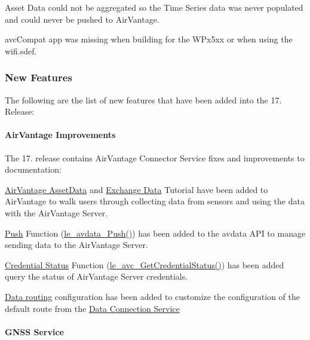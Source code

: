 \begin{DoxyItemize}
\item Asset Data could not be aggregated so the Time Series data was never populated and could never be pushed to Air\+Vantage.
\item avc\+Compat app was missing when building for the W\+Px5xx or when using the wifi.\+sdef.
\end{DoxyItemize}\hypertarget{releaseNotes17072_rn17_07_Features}{}\subsubsection{New Features}\label{releaseNotes17072_rn17_07_Features}
The following are the list of new features that have been added into the 17. Release\+:\hypertarget{releaseNotes17072_rn17_07_Features_AV}{}\paragraph{Air\+Vantage Improvements}\label{releaseNotes17072_rn17_07_Features_AV}
The 17. release contains Air\+Vantage Connector Service fixes and improvements to documentation\+:
\begin{DoxyItemize}
\item \hyperlink{sampleApps_AVAssetData}{Air\+Vantage Asset\+Data} and \hyperlink{avExchangeData}{Exchange Data} Tutorial have been added to Air\+Vantage to walk users through collecting data from sensors and using the data with the Air\+Vantage Server.
\item \hyperlink{c_le_avdata_le_avdata_field}{Push} Function (\hyperlink{le__avdata__interface_8h_a29358516371baeb8a3c3b03e5d2bd4ec}{le\+\_\+avdata\+\_\+\+Push()}) has been added to the {\ttfamily avdata} A\+PI to manage sending data to the Air\+Vantage Server.
\item \hyperlink{c_le_avc_c_le_avc_GetCredentialStatus}{Credential Status} Function (\hyperlink{le__avc__interface_8h_a315d820665c5679057c2ea9092cfe7f9}{le\+\_\+avc\+\_\+\+Get\+Credential\+Status()}) has been added query the status of Air\+Vantage Server credentials.
\item \hyperlink{c_le_avc_c_le_avc_routing}{Data routing} configuration has been added to customize the configuration of the default route from the \hyperlink{c_le_data_c_le_data_routing}{Data Connection Service}
\end{DoxyItemize}\hypertarget{releaseNotes17072_rn17_07_Features_GNSS}{}\paragraph{G\+N\+S\+S Service}\label{releaseNotes17072_rn17_07_Features_GNSS}
